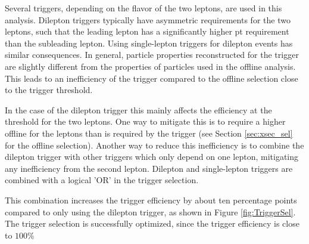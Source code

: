 Several triggers, depending on the flavor of the
two leptons, are used in this analysis. Dilepton triggers typically have asymmetric \pt requirements for the two leptons, such that the leading lepton has a significantly higher pt requirement than
the subleading lepton. Using single-lepton triggers for dilepton events has similar consequences. In general, particle properties reconstructed for the trigger are slightly different from the properties of particles used in the offline analysis. This
leads to an inefficiency of the trigger compared to the offline selection close to the trigger threshold.

In the case of the dilepton trigger this mainly affects the efficiency at the \pt threshold for the two leptons. One way to mitigate this is to
require a higher offline \pt for the leptons than is required by the trigger (see Section \ref{sec:xsec_sel} for the offline selection).
Another way to reduce this inefficiency is to combine the dilepton trigger with other triggers which only depend on one lepton, mitigating any
inefficiency from the second lepton. Dilepton and single-lepton triggers are combined with a logical 'OR' in the trigger selection.

This combination increases the trigger efficiency by about ten percentage points compared to only using the dilepton trigger, as shown in Figure \ref{fig:TriggerSel}.
The trigger selection is successfully optimized, since the trigger efficiency is close to $100\%$


